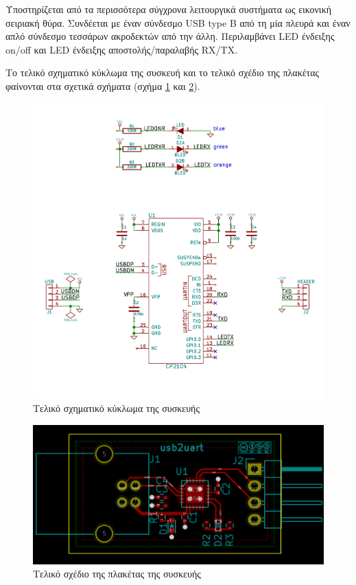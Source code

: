 \documentclass[a4paper]{article}
\begin{document}
Υποστηρίζεται από τα περισσότερα σύγχρονα λειτουργικά συστήματα ως εικονική σειριακή θύρα. Συνδέεται με έναν σύνδεσμο USB type B από τη μία πλευρά και έναν απλό σύνδεσμο τεσσάρων ακροδεκτών από την άλλη. Περιλαμβάνει LED ένδειξης on/off και LED ένδειξης αποστολής/παραλαβής RX/TX.

Το τελικό σχηματικό κύκλωμα της συσκευή και το τελικό σχέδιο της πλακέτας φαίνονται στα σχετικά σχήματα (σχήμα \ref{fig:eesch-schem-final} και \ref{fig:pcb-layout-final}).

\begin{figure}
  \begin{center}
    \includegraphics[width=.9\textwidth]{img/eesch-schem-final.png}
    \caption{Τελικό σχηματικό κύκλωμα της συσκευής}
    \label{fig:eesch-schem-final}
  \end{center}
\end{figure}

\begin{figure}
  \begin{center}
    \includegraphics[width=.9\textwidth]{img/pcb-layout-final.png}
    \caption{Τελικό σχέδιο της πλακέτας της συσκευής}
    \label{fig:pcb-layout-final}
  \end{center}
\end{figure}
\end{document}
